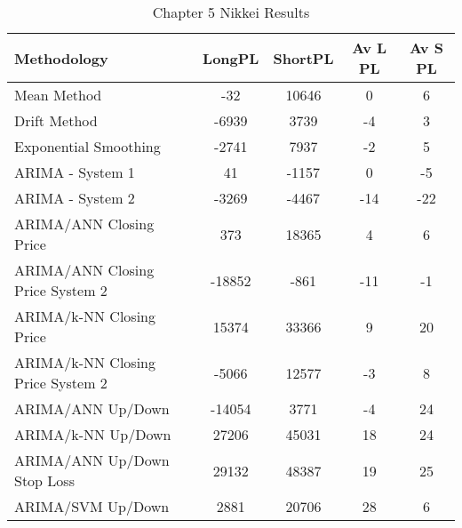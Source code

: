\begin{table}[ht]
\centering
\caption[Chapter 5 Nikkei Results]{Chapter 5 Nikkei Results} 
\label{tab:chp6:nik2_summary}
\begin{tabular}{lcccc}
  \toprule Methodology & LongPL & ShortPL & Av L PL & Av S PL \\ 
  \midrule Mean Method & -32 & 10646 & 0 & 6 \\ 
  Drift Method & -6939 & 3739 & -4 & 3 \\ 
  Exponential Smoothing & -2741 & 7937 & -2 & 5 \\ 
  ARIMA - System 1 & 41 & -1157 & 0 & -5 \\ 
  ARIMA - System 2 & -3269 & -4467 & -14 & -22 \\ 
  ARIMA/ANN Closing Price & 373 & 18365 & 4 & 6 \\ 
  ARIMA/ANN Closing Price System 2 & -18852 & -861 & -11 & -1 \\ 
  ARIMA/k-NN Closing Price & 15374 & 33366 & 9 & 20 \\ 
  ARIMA/k-NN Closing Price System 2 & -5066 & 12577 & -3 & 8 \\ 
  ARIMA/ANN Up/Down & -14054 & 3771 & -4 & 24 \\ 
  ARIMA/k-NN Up/Down & 27206 & 45031 & 18 & 24 \\ 
  ARIMA/ANN Up/Down Stop Loss & 29132 & 48387 & 19 & 25 \\ 
  ARIMA/SVM Up/Down & 2881 & 20706 & 28 & 6 \\ 
   \bottomrule \end{tabular}
\end{table}
